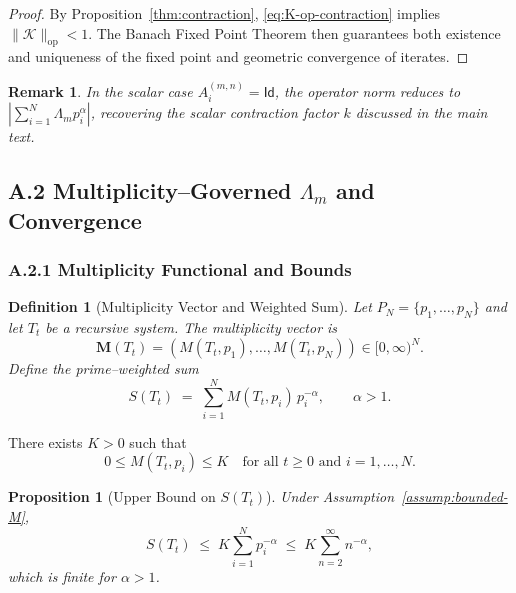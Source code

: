 \documentclass[11pt]{article}
\newtheorem{definition}{Definition}
\newtheorem{proposition}{Proposition}
\newtheorem{remark}{Remark}
\begin{document}
\begin{proof}
By Proposition~\ref{thm:contraction}, \eqref{eq:K-op-contraction} implies $\|\mathcal{K}\|_{\mathrm{op}}<1$. The Banach Fixed Point Theorem then guarantees both existence and uniqueness of the fixed point and geometric convergence of iterates.
\end{proof}

\begin{remark}
In the scalar case $A^{(m,n)}_i = \mathsf{Id}$, the operator norm reduces to $|\sum_{i=1}^N \Lambda_m p_i^{\alpha}|$, recovering the scalar contraction factor $k$ discussed in the main text.
\end{remark}

\subsection*{A.2 Multiplicity–Governed $\Lambda_m$ and Convergence}

\subsubsection*{A.2.1 Multiplicity Functional and Bounds}

\begin{definition}[Multiplicity Vector and Weighted Sum]
Let $P_N = \{p_1,\dots,p_N\}$ and let $T_t$ be a recursive system. The \emph{multiplicity vector} is
\[
  \bm{M}(T_t) = (M(T_t,p_1),\dots,M(T_t,p_N)) \in [0,\infty)^N.
\]
Define the prime–weighted sum
\begin{equation}
  S(T_t)
  \;=\;
  \sum_{i=1}^N M(T_t,p_i)\, p_i^{-\alpha},
  \qquad \alpha > 1.
  \label{eq:S-multiplicity-def}
\end{equation}
\end{definition}

\begin{assumption}\label{assump:bounded-M}
There exists $K>0$ such that
\[
0 \le M(T_t,p_i) \le K
\quad\text{for all } t\ge 0 \text{ and } i=1,\dots,N.
\]
\end{assumption}

\begin{proposition}[Upper Bound on $S(T_t)$]
Under Assumption~\ref{assump:bounded-M},
\begin{equation}
  S(T_t)
  \;\leq\;
  K \sum_{i=1}^N p_i^{-\alpha}
  \;\leq\;
  K \sum_{n=2}^{\infty} n^{-\alpha},
\end{equation}
which is finite for $\alpha>1$.
\end{proposition}
\end{document}

